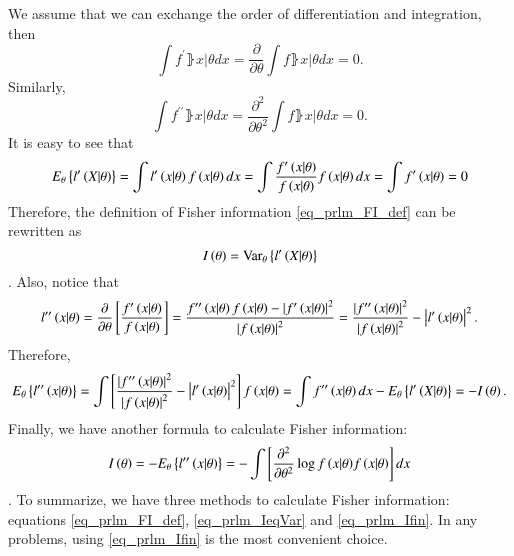 We assume that we can exchange the order of differentiation and integration, then
\begin{equation*}
    \int{}f^{\prime}\rBrace{x|\theta}dx=\frac{\partial}{\partial\theta}\int{}f\rBrace{x|\theta}dx=0.
\end{equation*}
Similarly,
\begin{equation*}
    \int{}f^{\prime\prime}\rBrace{x|\theta}dx=\frac{\partial^{2}}{\partial\theta^{2}}\int{}f\rBrace{x|\theta}dx=0.
\end{equation*}
It is easy to see that
\begin{equation*}
    E_{\theta}\left\{{l^{\prime}\left({X|\theta}\right)}\right\}=\int{}l^{\prime}\left({x|\theta}\right)f\left({x|\theta}\right)dx=\int{}\frac{f^{\prime}\left({x|\theta}\right)}{f\left({x|\theta}\right)}f\left({x|\theta}\right)dx=\int{}f^{\prime}\left({x|\theta}\right)=0
\end{equation*}
Therefore, the definition of Fisher information \eqref{eq_prlm_FI_def} can be rewritten as
\begin{equation}
\label{eq_prlm_IeqVar}
    I\left({\theta}\right)=\text{Var}_{\theta}\left\{{l^{\prime}\left({X|\theta}\right)}\right\}
\end{equation}.
Also, notice that
\begin{equation*}
    l^{\prime\prime}\left({x|\theta}\right)=\frac{\partial}{\partial\theta}\left[{\frac{f^{\prime}\left({x|\theta}\right)}{f\left({x|\theta}\right)}}\right]=\frac{f^{\prime\prime}\left({x|\theta}\right)f\left({x|\theta}\right)-\left\vert f^{\prime}\left({x|\theta}\right)\right\vert^{2}}{\left\vert f\left({x|\theta}\right)\right\vert^{2}}=\frac{\left\vert f^{\prime\prime}\left({x|\theta}\right)\right\vert^{2}}{\left\vert f\left({x|\theta}\right)\right\vert^{2}}-\left\vert l^{\prime}\left({x|\theta}\right)\right\vert^{2}.
\end{equation*}
Therefore,
\begin{equation*}
    E_{\theta}\left\{{l^{\prime\prime}\left({x|\theta}\right)}\right\}=\int{\left[{\frac{\left\vert f^{\prime\prime}\left({x|\theta}\right)\right\vert^{2}}{\left\vert f\left({x|\theta}\right)\right\vert^{2}}-\left\vert l^{\prime}\left({x|\theta}\right)\right\vert^{2}}\right]f\left({x|\theta}\right)}=\int{f^{\prime\prime}\left({x|\theta}\right)dx}-E_{\theta}\left\{{l^{\prime}\left({X|\theta}\right)}\right\}=-I\left({\theta}\right).
\end{equation*}
Finally, we have another formula to calculate Fisher information:
\begin{equation}
\label{eq_prlm_Ifin}
    I\left({\theta}\right) = -E_{\theta}\left\{{l^{\prime\prime}\left({x|\theta}\right)}\right\}=-\int{\left[{\frac{\partial^{2}}{\partial\theta^{2}}\log{f\left({x|\theta}\right)}f\left({x|\theta}\right)}\right]dx}
\end{equation}.
To summarize, we have three methods to calculate Fisher information: equations \eqref{eq_prlm_FI_def}, \eqref{eq_prlm_IeqVar} and \eqref{eq_prlm_Ifin}.
In any problems, using \eqref{eq_prlm_Ifin} is the most convenient choice.
